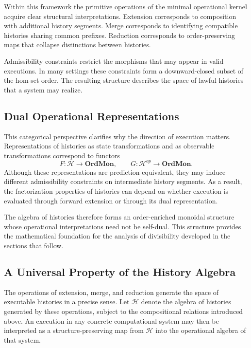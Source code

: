 \documentclass[12pt]{article}
\begin{document}
Within this framework the primitive operations of the minimal operational kernel acquire
clear structural interpretations. Extension corresponds to composition with additional history
segments. Merge corresponds to identifying compatible histories sharing common prefixes.
Reduction corresponds to order-preserving maps that collapse distinctions between histories.

Admissibility constraints restrict the morphisms that may appear in valid executions. In many
settings these constraints form a downward-closed subset of the hom-set order. The resulting
structure describes the space of lawful histories that a system may realize.

\subsection{Dual Operational Representations}

This categorical perspective clarifies why the direction of execution matters. Representations
of histories as state transformations and as observable transformations correspond to functors
\[
F : \mathcal{H} \to \mathbf{OrdMon}, \qquad
G : \mathcal{H}^{op} \to \mathbf{OrdMon}.
\]
Although these representations are prediction-equivalent, they may induce different admissibility
constraints on intermediate history segments. As a result, the factorization properties of
histories can depend on whether execution is evaluated through forward extension or through its
dual representation.

The algebra of histories therefore forms an order-enriched monoidal structure whose operational
interpretations need not be self-dual. This structure provides the mathematical foundation for
the analysis of divisibility developed in the sections that follow.

\subsection{A Universal Property of the History Algebra}

The operations of extension, merge, and reduction generate the space of executable histories in
a precise sense. Let $\mathcal{H}$ denote the algebra of histories generated by these
operations, subject to the compositional relations introduced above. An execution in any
concrete computational system may then be interpreted as a structure-preserving map from
$\mathcal{H}$ into the operational algebra of that system.
\end{document}
